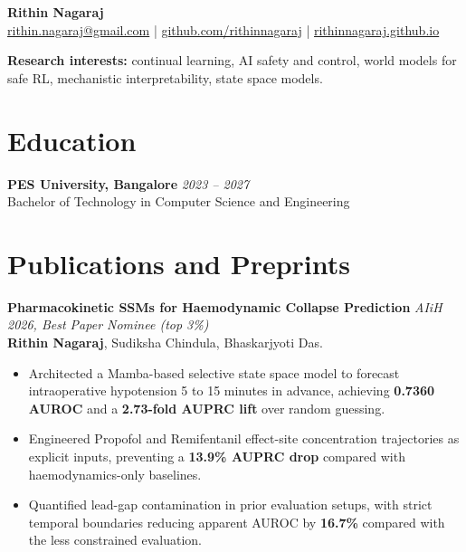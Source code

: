 \documentclass[10pt,a4paper]{article}
\newcommand{\entrygap}{\vspace{5pt}\needspace{4\baselineskip}}
\begin{document}
\begin{center}
  {\huge \textbf{Rithin Nagaraj}} \\
  \vspace{2pt}
  \href{mailto:rithin.nagaraj@gmail.com}{rithin.nagaraj@gmail.com}
  \quad | \quad
  \href{https://github.com/rithinnagaraj}{github.com/rithinnagaraj}
  \quad | \quad
  \href{https://rithinnagaraj.github.io}{rithinnagaraj.github.io}
\end{center}

\vspace{-2pt}
\textbf{Research interests:} continual learning, AI safety and control, world models for safe RL, mechanistic interpretability, state space models.

\section{Education}
\textbf{PES University, Bangalore} \hfill \textit{2023 -- 2027} \\
Bachelor of Technology in Computer Science and Engineering

\section{Publications and Preprints}

\textbf{Pharmacokinetic SSMs for Haemodynamic Collapse Prediction}
\hfill \textit{AIiH 2026, Best Paper Nominee (top 3\%)} \\
\textbf{Rithin Nagaraj}, Sudiksha Chindula, Bhaskarjyoti Das.
\begin{itemize}
  \item Architected a Mamba-based selective state space model to forecast intraoperative hypotension 5 to 15 minutes in advance, achieving \textbf{0.7360 AUROC} and a \textbf{2.73-fold AUPRC lift} over random guessing.
  \item Engineered Propofol and Remifentanil effect-site concentration trajectories as explicit inputs, preventing a \textbf{13.9\% AUPRC drop} compared with haemodynamics-only baselines.
  \item Quantified lead-gap contamination in prior evaluation setups, with strict temporal boundaries reducing apparent AUROC by \textbf{16.7\%} compared with the less constrained evaluation.
\end{itemize}
\entrygap
\end{document}
